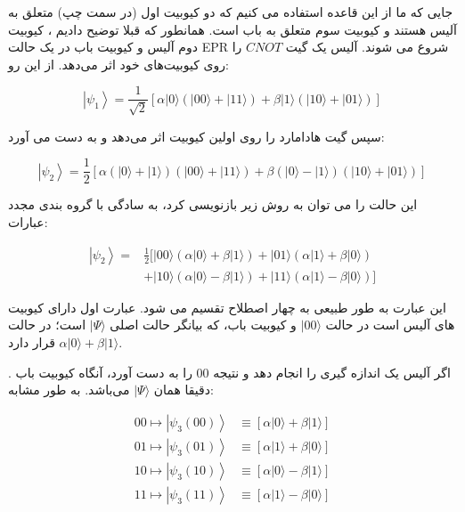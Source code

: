 \documentclass{book}
\begin{document}
جایی که ما از این قاعده استفاده می کنیم که دو کیوبیت اول (در سمت چپ) متعلق به آلیس هستند و
کیوبیت سوم متعلق به باب است. همانطور که قبلا توضیح دادیم ، کیوبیت دوم آلیس و کیوبیت باب
در یک حالت EPR شروع می شوند. آلیس یک گیت $CNOT$ را روی کیوبیت‌های خود اثر می‌دهد. از این رو:


\begin{center}
	\begin{equation}\label{Teleport psi1}
		\left|\psi_1\right\rangle=\frac{1}{\sqrt{2}}[\alpha|0\rangle(|00\rangle+|11\rangle)+\beta|1\rangle(|10\rangle+|01\rangle)]
	\end{equation}
\end{center}

سپس گیت هادامارد را روی اولین کیوبیت اثر می‌دهد و به دست می آورد:

\begin{center}
	\begin{equation}\label{Teleport psi2}
		\left|\psi_2\right\rangle=\frac{1}{2}[\alpha(|0\rangle+|1\rangle)(|00\rangle+|11\rangle)+\beta(|0\rangle-|1\rangle)(|10\rangle+|01\rangle)]
	\end{equation}
\end{center}

این حالت را می توان به روش زیر بازنویسی کرد، به سادگی با گروه بندی مجدد عبارات:

\begin{center}
	\begin{equation}\label{Teleport psi2 rewrite}
		\begin{aligned}
			\left|\psi_2\right\rangle= & \frac{1}{2}[|00\rangle(\alpha|0\rangle+\beta|1\rangle)+|01\rangle(\alpha|1\rangle+\beta|0\rangle) \\
			& +|10\rangle(\alpha|0\rangle-\beta|1\rangle)+|11\rangle(\alpha|1\rangle-\beta|0\rangle)]
		\end{aligned}
	\end{equation}

\end{center}


این عبارت به طور طبیعی به چهار اصطلاح تقسیم می شود. عبارت اول دارای کیوبیت های آلیس است
در حالت $\vert 00 \rangle$ و کیوبیت باب، که بیانگر حالت اصلی $\vert \Psi \rangle$ است؛ در حالت $\alpha \vert 0 \rangle + \beta \vert 1 \rangle$  قرار دارد.


. اگر آلیس یک اندازه گیری را انجام دهد و نتیجه 00 را به دست آورد، آنگاه کیوبیت باب دقیقا همان $\vert \Psi \rangle$ می‌باشد. به طور مشابه:
\begin{center}
	\begin{equation}\label{alice action}
		\begin{aligned}
			00 \longmapsto\left|\psi_3(00)\right\rangle & \equiv[\alpha|0\rangle+\beta|1\rangle] \\
			01 \longmapsto\left|\psi_3(01)\right\rangle & \equiv[\alpha|1\rangle+\beta|0\rangle] \\
			10 \longmapsto\left|\psi_3(10)\right\rangle & \equiv[\alpha|0\rangle-\beta|1\rangle] \\
			11 \longmapsto\left|\psi_3(11)\right\rangle & \equiv[\alpha|1\rangle-\beta|0\rangle]
		\end{aligned}
	\end{equation}
\end{center}
\end{document}
